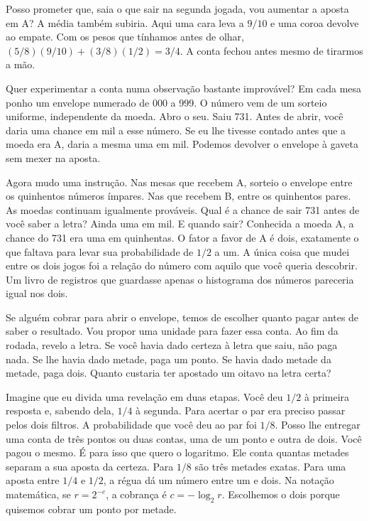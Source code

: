 Posso prometer que, saia o que sair na segunda jogada, vou aumentar a aposta em A? A média também subiria. Aqui uma cara leva a $9/10$ e uma coroa devolve ao empate. Com os pesos que tínhamos antes de olhar, $(5/8)(9/10)+(3/8)(1/2)=3/4$. A conta fechou antes mesmo de tirarmos a mão.

Quer experimentar a conta numa observação bastante improvável? Em cada mesa ponho um envelope numerado de 000 a 999. O número vem de um sorteio uniforme, independente da moeda. Abro o seu. Saiu 731. Antes de abrir, você daria uma chance em mil a esse número. Se eu lhe tivesse contado antes que a moeda era A, daria a mesma uma em mil. Podemos devolver o envelope à gaveta sem mexer na aposta.

Agora mudo uma instrução. Nas mesas que recebem A, sorteio o envelope entre os quinhentos números ímpares. Nas que recebem B, entre os quinhentos pares. As moedas continuam igualmente prováveis. Qual é a chance de sair 731 antes de você saber a letra? Ainda uma em mil. E quando sair? Conhecida a moeda A, a chance do 731 era uma em quinhentas. O fator a favor de A é dois, exatamente o que faltava para levar sua probabilidade de $1/2$ a um. A única coisa que mudei entre os dois jogos foi a relação do número com aquilo que você queria descobrir. Um livro de registros que guardasse apenas o histograma dos números pareceria igual nos dois.

Se alguém cobrar para abrir o envelope, temos de escolher quanto pagar antes de saber o resultado. Vou propor uma unidade para fazer essa conta. Ao fim da rodada, revelo a letra. Se você havia dado certeza à letra que saiu, não paga nada. Se lhe havia dado metade, paga um ponto. Se havia dado metade da metade, paga dois. Quanto custaria ter apostado um oitavo na letra certa?

Imagine que eu divida uma revelação em duas etapas. Você deu $1/2$ à primeira resposta e, sabendo dela, $1/4$ à segunda. Para acertar o par era preciso passar pelos dois filtros. A probabilidade que você deu ao par foi $1/8$. Posso lhe entregar uma conta de três pontos ou duas contas, uma de um ponto e outra de dois. Você pagou o mesmo. É para isso que quero o logaritmo. Ele conta quantas metades separam a sua aposta da certeza. Para $1/8$ são três metades exatas. Para uma aposta entre $1/4$ e $1/2$, a régua dá um número entre um e dois. Na notação matemática, se $r=2^{-c}$, a cobrança é $c=-\log_2 r$. Escolhemos o dois porque quisemos cobrar um ponto por metade.

